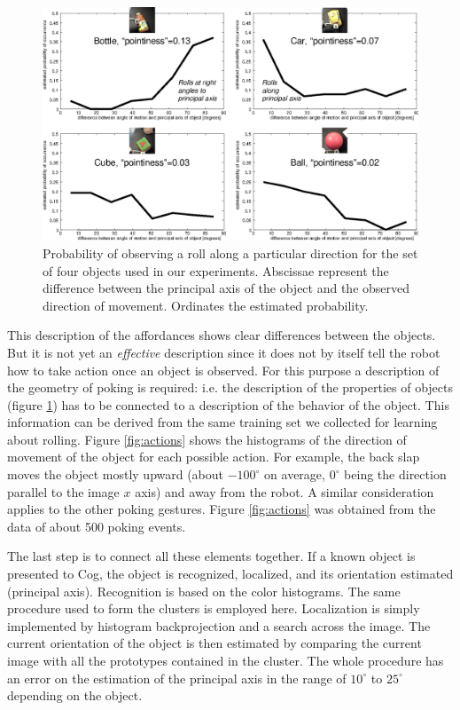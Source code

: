 \begin{figure}[tbh]
\begin{center}
\includegraphics[width=\columnwidth]{affordances.eps}
\caption{ 
\label{fig:affordances}
%
Probability of observing a roll along a particular direction for the set
of four objects used in our experiments. Abscissae represent the difference
between the principal axis of the object and the observed direction of 
movement. Ordinates the estimated probability.
%
}
\end{center}
\end{figure}

This description of the affordances shows clear differences between the
objects.
But it is not yet an {\em effective} description since
it does not by itself tell the robot how to take
action once an object is observed. For this purpose a description of 
the geometry of poking is required: i.e. the description of the properties of 
objects (figure \ref{fig:affordances}) has to be connected to a description
of the behavior of the object. 
This information can be derived from the same training set we collected for learning
about rolling. Figure \ref{fig:actions} shows the histograms of the direction 
of movement of the object for
each possible action. For example, the back slap moves the object mostly upward
(about $-100^\circ$ on average, $0^\circ$ being the direction parallel to the image
$x$ axis) and away from the robot. A similar consideration applies
to the other poking gestures. Figure \ref{fig:actions} was obtained from the data of
about 500 poking events.

The last step is to connect all these elements together. If a known object is
presented to Cog, the object is recognized, localized, and
its orientation estimated (principal axis). Recognition is based on the color histograms. The same
procedure used to form the clusters is employed here. Localization is simply implemented 
by histogram backprojection and a search across the image. The current orientation of the
object is then estimated by comparing the current image with all the prototypes 
contained in the cluster. The whole procedure has an error on the estimation
of the principal axis in the range of $10^\circ$ to $25^\circ$ depending on the object.  

